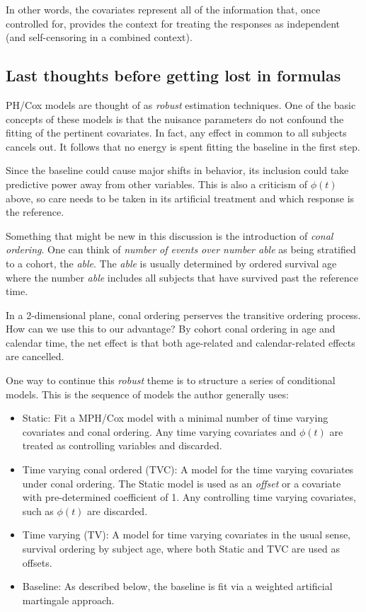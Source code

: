 \documentclass[10pt]{article}
\begin{document}
In other words, the covariates represent all of the information that, once controlled for, provides the context for treating 
the responses as independent (and self-censoring in a combined context).

\subsection{Last thoughts before getting lost in formulas}

PH/Cox models are thought of as {\em robust} estimation techniques.
One of the basic concepts of these models is that the nuisance parameters do not confound the fitting of the pertinent covariates.  
In fact, any effect in common to all subjects cancels out.  It follows that 
no energy is spent fitting the baseline in the first step.  

Since the baseline could cause major shifts in behavior, its inclusion could take predictive power away from other variables.  
This is also a criticism of $\phi(t)$ above, so care needs to be taken in its artificial treatment and which response is the reference.

Something that might be new in this discussion is the introduction of {\em conal ordering}.
One can think of {\em number of events over number able} as being stratified to a cohort, the {\em able}.   
The {\em able} is usually determined by ordered survival age where the number {\em able} includes all subjects that have survived past the
reference time.

In a 2-dimensional plane, conal ordering perserves the
transitive ordering process.  How can we use this to our advantage?  By cohort conal ordering in age and calendar time,
        the net effect is that both age-related and calendar-related effects are cancelled.  

One way to continue this {\em robust} theme is to structure a series of conditional models.  This is the sequence of 
models the author generally uses:
\begin{itemize}
\item Static:  Fit a MPH/Cox model with a minimal number of time varying covariates and conal ordering.  Any time varying covariates and $\phi(t)$ 
    are treated as controlling variables and discarded.
\item Time varying conal ordered (TVC):
    A model for the time varying covariates under conal ordering.
    The Static model is used as an {\em offset} or a covariate with pre-determined coefficient of 1.
        Any controlling time varying covariates, such as $\phi(t)$ are discarded.
\item Time varying (TV): 
    A model for time varying covariates in the usual sense, survival ordering by subject age, where both Static and TVC are used as offsets.
\item Baseline:
    As described below, the baseline is fit via a weighted artificial martingale approach. 
\end{itemize}
\end{document}
